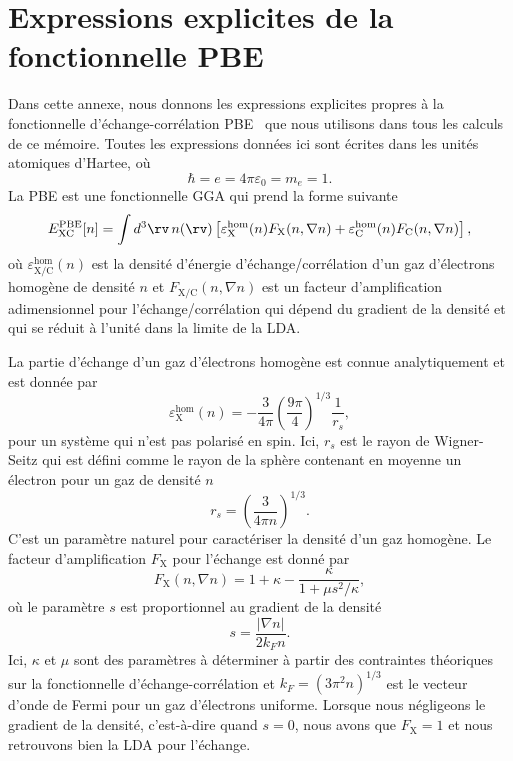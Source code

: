 \chapter{Expressions explicites de la fonctionnelle PBE}\label{annexe:pbe}
\renewcommand{\theequation}{A.\arabic{equation}}

Dans cette annexe, nous donnons les expressions explicites propres à la fonctionnelle d'échange-corrélation PBE~\cite{perdewGeneralizedGradientApproximation1996a} que nous utilisons dans tous les calculs de ce mémoire. Toutes les expressions données ici sont écrites dans les unités atomiques d'Hartee, où
\begin{equation}
    \hbar = e = 4\pi\varepsilon_0 = m_e = 1.
    \label{eqn:a1_unités_hartree}
\end{equation}
La PBE est une fonctionnelle GGA qui prend la forme suivante
\begin{equation}
    E_\text{XC}^\text{PBE}[n]=\int d^3\rv\,n(\rv)\left[\varepsilon_\text{X}^\text{hom}(n)F_\text{X}(n,\nabla n)+\varepsilon_\text{C}^\text{hom}(n)F_\text{C}(n,\nabla n)\right],
    \label{eqn:a1_EPBE}
\end{equation}
où $\varepsilon_\text{X/C}^\text{hom}(n)$ est la densité d'énergie d'échange/corrélation d'un gaz d'électrons homogène de densité $n$ et $F_\text{X/C}(n,\nabla n)$ est un facteur d'amplification adimensionnel pour l'échange/corrélation qui dépend du gradient de la densité et qui se réduit à l'unité dans la limite de la LDA.

La partie d'échange d'un gaz d'électrons homogène est connue analytiquement et est donnée par~\cite{martinElectronicStructureBasic2004}
\begin{equation}
    \varepsilon_\text{X}^\text{hom}(n)=-\frac{3}{4\pi}\left(\frac{9\pi}{4}\right)^{1/3}\frac{1}{r_s},
    \label{eqn:a1_eX}
\end{equation}
pour un système qui n'est pas polarisé en spin. Ici, $r_s$ est le rayon de Wigner-Seitz qui est défini comme le rayon de la sphère contenant en moyenne un électron pour un gaz de densité $n$
\begin{equation}
    r_s = \left(\frac{3}{4\pi n}\right)^{1/3}.
    \label{eqn:a1_rs}
\end{equation}
C'est un paramètre naturel pour caractériser la densité d'un gaz homogène. Le facteur d'amplification $F_\text{X}$ pour l'échange est donné par
\begin{equation}
    F_\text{X}(n,\nabla n)=1+\kappa-\frac{\kappa}{1+\mu s^2/\kappa},
    \label{eqn:a1_FX}
\end{equation}
où le paramètre $s$ est proportionnel au gradient de la densité
\begin{equation}
    s=\frac{|\nabla n|}{2k_Fn}.
\end{equation}
Ici, $\kappa$ et $\mu$ sont des paramètres à déterminer à partir des contraintes théoriques sur la fonctionnelle d'échange-corrélation et $k_F=(3\pi^2n)^{1/3}$ est le vecteur d'onde de Fermi pour un gaz d'électrons uniforme. Lorsque nous négligeons le gradient de la densité, c'est-à-dire quand $s=0$, nous avons que $F_\text{X}=1$ et nous retrouvons bien la LDA pour l'échange. 

